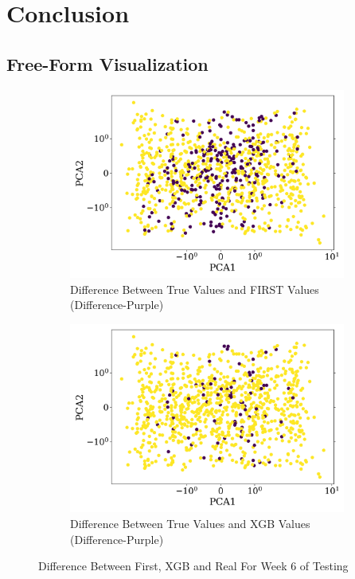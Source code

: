 \documentclass{article}
\begin{document}
\section{Conclusion}

\subsection{Free-Form Visualization}

\begin{figure}[H]
    \centering
    \begin{subfigure}[t]{0.495\textwidth}
        \centering
        \includegraphics[width=\textwidth]{results/XGB_Diff_FIRST_True_Week_6_With_RS_True.png}
        \caption{Difference Between True Values and FIRST Values (Difference-Purple)}
        \label{fig:diff_first_real_conclusion}
    \end{subfigure}
    \hfill
    \begin{subfigure}[t]{0.495\textwidth}
        \centering
        \includegraphics[width=\textwidth]{results/XGB_Diff_XGB_True_Week_6_With_RS_True.png}
        \caption{Difference Between True Values and XGB Values (Difference-Purple)}
        \label{fig:diff_xgb_first_conclusion}
    \end{subfigure}
    \caption{Difference Between First, XGB and Real For Week 6 of Testing}
    \label{fig:diff_first_xgb}
\end{figure}
\end{document}
